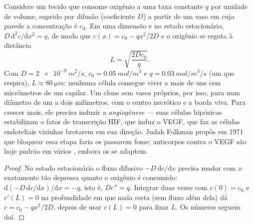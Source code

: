 \begin{proposition}\label{prop:b3:cancer-biology:oxygen}
Considere um tecido que consome oxigênio a uma taxa constante $q$ por
unidade de volume, suprido por difusão (coeficiente $D$) a partir de um
vaso em cuja parede a concentração é $c_{0}$. Em uma dimensão e no
estado estacionário, $D\,
\mathrm{d}^{2}c/\mathrm{d}x^{2} = q$, de modo
que $c(x) = c_{0} - qx^{2}/2D$ e o oxigênio se esgota à distância
\[
L = \sqrt{\frac{2Dc_{0}}{q}} .
\]
Com $D = \qty{2e-9}{m^2/s}$, $c_{0} = \qty{0.05}{mol/m^3}$ e
$q =
\qty{0.03}{mol/m^3/s}$ (um  que respira),
$L \approx \qty{80}{\micro
m}$: nenhuma célula consegue viver a mais de
uns cem micrômetros de um capilar. Um clone sem vasos próprios, por
isso, para num diâmetro de um a dois milímetros, com o centro necrótico
e a borda viva. Para crescer mais, ele precisa induzir a
\emph{angiogênese} --- suas células hipóxicas estabilizam o fator de
transcrição HIF, que induz o VEGF, que faz as células endoteliais
vizinhas brotarem em sua direção. Judah Folkman propôs em 1971 que
bloquear essa etapa faria os  passarem fome; anticorpos contra o
VEGF são hoje padrão em vários , embora os  se adaptem.
\end{proposition}
\begin{proof}
No estado estacionário o fluxo difusivo $-D\,\mathrm{d}c/\mathrm{d}x$
precisa mudar com $x$ exatamente tão depressa quanto o oxigênio é
consumido: $\mathrm{d}(-D\,
\mathrm{d}c/\mathrm{d}x)/\mathrm{d}x = -q$,
isto é, $D c'' = q$. Integrar duas vezes com $c(0) = c_{0}$ e
$c'(L) = 0$ na profundidade em que nada resta (sem fluxo além dela) dá
$c = c_{0} - qx^{2}/2D$, depois de usar $c(L) = 0$ para fixar $L$. Os
números seguem daí.
\end{proof}

